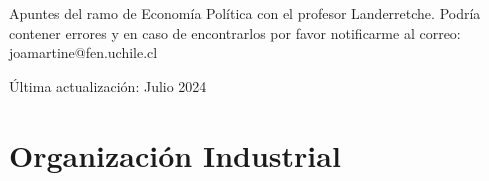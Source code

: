 \documentclass[12pt]{book}
\begin{document}
Apuntes del ramo de Economía Política con el profesor Landerretche. Podría contener errores y en caso de encontrarlos por favor notificarme al correo: joamartine@fen.uchile.cl

Última actualización: Julio 2024

\newpage

\setcounter{chapter}{3}

\chapter{Organización Industrial}





\begin{appendices}
    
\end{appendices}
\end{document}
